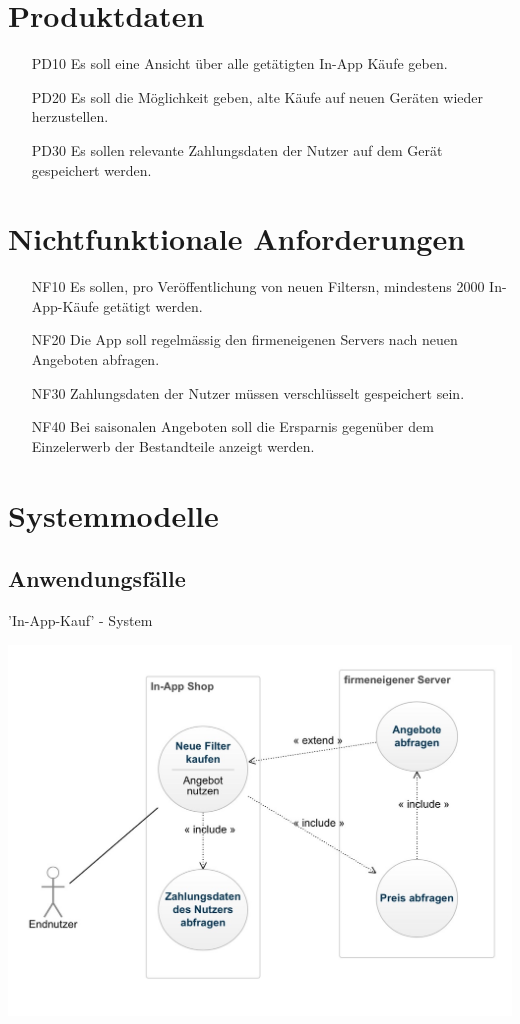 \documentclass[parskip=full]{scrartcl}
\begin{document}
\section{Produktdaten}
\begin{itemize}[nosep]
\item[PD10] Es soll eine Ansicht \"uber alle get\"atigten In-App K\"aufe geben.
\item[PD20] Es soll die M\"oglichkeit geben, alte K\"aufe auf neuen Ger\"aten wieder herzustellen.
\item[PD30] Es sollen relevante Zahlungsdaten der Nutzer auf dem Ger\"at gespeichert werden.
\end{itemize}

\section{Nichtfunktionale Anforderungen}
\begin{itemize}[nosep]
\item[NF10] Es sollen, pro Ver\"offentlichung von neuen \glspl{Filter}n, mindestens 2000 In-App-K\"aufe get\"atigt werden.
\item[NF20] Die App soll regelm\"assig den firmeneigenen \glspl{Server} nach neuen Angeboten abfragen.
\item[NF30] Zahlungsdaten der Nutzer m\"ussen verschl\"usselt gespeichert sein.
\item[NF40] Bei saisonalen Angeboten soll die Ersparnis gegen\"uber dem Einzelerwerb der Bestandteile anzeigt werden.
\end{itemize}

\newpage

\section{Systemmodelle}

\subsection{Anwendungsf\"alle}
'In-App-Kauf' - System
\begin{center}
\includegraphics[width=1\textwidth]{In-App-Kauf-System.jpg}
\end{center}

\glsaddall
\printnoidxglossaries
\end{document}
